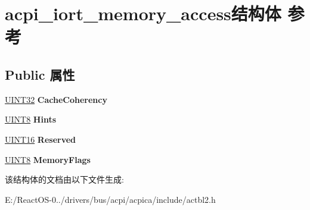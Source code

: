 \hypertarget{structacpi__iort__memory__access}{}\section{acpi\+\_\+iort\+\_\+memory\+\_\+access结构体 参考}
\label{structacpi__iort__memory__access}
\subsection*{Public 属性}
\begin{DoxyCompactItemize}
\item 
\mbox{\label{structacpi__iort__memory__access_a1211df6c1d3461dcae1842af24bd64d6}} 
\hyperlink{_processor_bind_8h_ae1e6edbbc26d6fbc71a90190d0266018}{U\+I\+N\+T32} {\bfseries Cache\+Coherency}
\item 
\mbox{\label{structacpi__iort__memory__access_ab2fc28e7c3046e9a18cab6379e57af31}} 
\hyperlink{_processor_bind_8h_ab27e9918b538ce9d8ca692479b375b6a}{U\+I\+N\+T8} {\bfseries Hints}
\item 
\mbox{\label{structacpi__iort__memory__access_a41e16910d3575996bb10c0532d219bc2}} 
\hyperlink{_processor_bind_8h_a09f1a1fb2293e33483cc8d44aefb1eb1}{U\+I\+N\+T16} {\bfseries Reserved}
\item 
\mbox{\label{structacpi__iort__memory__access_a9ef21022e074e19ba55c6b1641db68b8}} 
\hyperlink{_processor_bind_8h_ab27e9918b538ce9d8ca692479b375b6a}{U\+I\+N\+T8} {\bfseries Memory\+Flags}
\end{DoxyCompactItemize}


该结构体的文档由以下文件生成\+:\begin{DoxyCompactItemize}
\item 
E\+:/\+React\+O\+S-\/0../drivers/bus/acpi/acpica/include/actbl2.\+h\end{DoxyCompactItemize}
